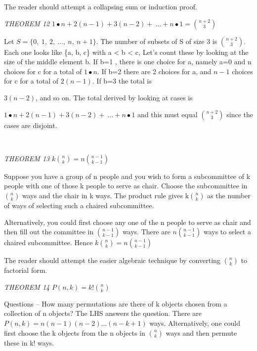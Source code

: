 The reader should attempt a collapsing sum or induction proof.

\emph{THEOREM 12}
\(1 \bullet n + 2\left( n - 1 \right) + 3\left( n - 2 \right) + \ \ldots + n \bullet 1 =
\binom{n + 2}{3}
\)

Let \(S = \{ 0,\ 1,\ 2,\ \ldots,\ n,\ n + 1\}\). The number of subsets
of S of size 3 is \(\binom{n + 2}{3}
\). Each one looks like \{a, b, c\} with a \textless{} b
\textless{} c, Let's count these by looking at the size of the middle
element b. If b=1 , there is one choice for a, namely a=0 and n choices
for c for a total of \(1 \bullet n\). If b=2 there are 2 choices for a,
and \(n - 1\) choices for c for a total of \(2(n - 1)\). If b=3 the
total is

\(3(n - 2)\), and so on. The total derived by looking at cases is

\(1 \bullet n + 2\left( n - 1 \right) + 3\left( n - 2 \right) + \ \ldots + n \bullet 1\)
and this must equal \(\binom{n + 2}{3}
\) since the cases are disjoint.

\emph{\\
}

\emph{THEOREM 13} \(k
\binom{n}{k}
 = n
\binom{n - 1}{k - 1}
\)

Suppose you have a group of n people and you wish to form a subcommittee
of k people with one of those k people to serve as chair. Choose the
subcommittee in \(\binom{n}{k}
\) ways and the chair in k ways. The product rule
gives\(\text{\ k}
\binom{n}{k}
\) as the number of ways of selecting such a chaired
subcommittee.

Alternatively, you could first choose any one of the n people to serve
as chair and then fill out the committee in \(\binom{n - 1}{k - 1}
\) ways. There are \(n
\binom{n - 1}{k - 1}
\) ways to select a chaired subcommittee. Hence
\(k
\binom{n}{k}
 = n
\binom{n - 1}{k - 1}
\)

The reader should attempt the easier algebraic technique by converting
\(\binom{n}{k}
\) to factorial form.

\emph{THEOREM 14} \(P\left( n,k \right) = k!
\binom{n}{k}
\)

Questions -- How many permutations are there of k objects chosen from a
collection of n objects? The LHS answers the question. There are
\(P\left( n,k \right) = n\left( n - 1 \right)\left( n - 2 \right)...(n - k + 1)\)
ways. Alternatively, one could first choose the k objects from the n
objects in \(\binom{n}{k}
\) ways and then permute these in k! ways.

